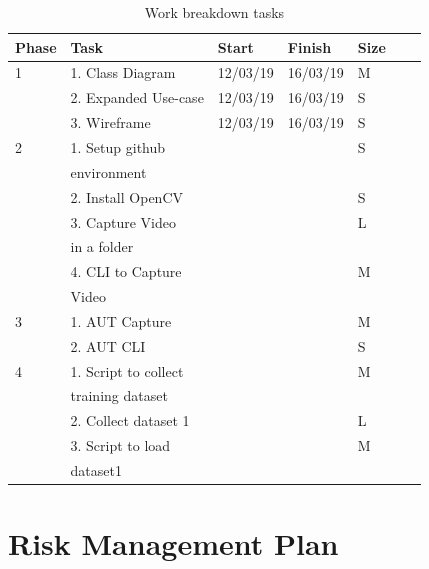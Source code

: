 \documentclass[12pt,a4paper,man]{report}
\begin{document}
\begin{table}[htbp]
\caption{\label{table:wbs_table}
Work breakdown tasks}
\centering
\begin{tabular}{|l|l|l|l|l|lp{3cm}|}
\hline
\textbf{Phase} & \textbf{Task} & \textbf{Start} & \textbf{Finish} & \textbf{Size}\\
\hline
1 & 1. Class Diagram & 12/03/19 & 16/03/19 & M\\
 & 2. Expanded Use-case & 12/03/19 & 16/03/19 & S\\
 & 3. Wireframe & 12/03/19 & 16/03/19 & S\\
\hline
2 & 1. Setup github &  &  & S\\
 & environment &  &  & \\
 & 2. Install OpenCV &  &  & S\\
 & 3. Capture Video &  &  & L\\
 & in a folder &  &  & \\
 & 4. CLI to Capture &  &  & M\\
 & Video &  &  & \\
\hline
3 & 1. AUT Capture &  &  & M\\
 & 2. AUT CLI &  &  & S\\
\hline
4 & 1. Script to collect &  &  & M\\
 & training dataset &  &  & \\
 & 2. Collect dataset 1 &  &  & L\\
 & 3. Script to load &  &  & M\\
 & dataset1 &  &  & \\
\hline
\end{tabular}
\end{table}



\chapter{Risk Management Plan}
\label{sec:orgb975f3e}
\end{document}
